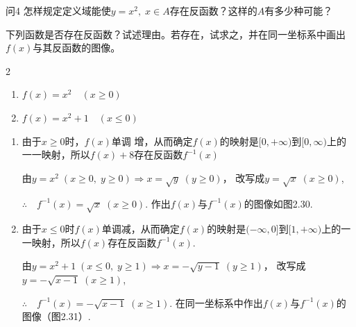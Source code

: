 \begin{thm}{问4}
    怎样规定定义域能使$y=x^2,\; x\in A$存在反函数？这样的$A$有多少种可能？
\end{thm}

\begin{example}
    下列函数是否存在反函数？试述理由。若存在，试求之，并在同一坐标系中画出$f(x)$与其反函数的图像。
\begin{multicols}{2}
\begin{enumerate}[(1)]
    \item $f(x)=x^2\quad (x\ge 0)$
    \item $f(x)=x^2+1\quad (x\le 0)$
\end{enumerate}
\end{multicols}
\end{example}

\begin{solution}
\begin{enumerate}[(1)]
    \item 由于$x\ge 0$时，$f(x)$单调 增，从而确定$f(x)$的映射是$[0,+\infty)$到$[0,\infty)$上的一一映射，所以$f(x)+8$存在反函数$f^{-1}(x)$

    由$y=x^2\; (x\ge 0,\; y\ge 0)\Longrightarrow x=\sqrt{y}\; (y\ge 0)$，
    改写成$y=\sqrt{x}\; (x\ge 0)$,

$\therefore\quad     f^{-1}(x)=\sqrt{x}\; (x\ge 0)$. 作出$f(x)$与$f^{-1}(x)$的图像如图2.30.

\item 由于$x\le 0$时$f(x)$单调减，从而确定$f(x)$的映射是$(-\infty,0]$到$[1,+\infty)$上的一一映射，所以$f(x)$存在反函数$f^{-1}(x)$.

由$y=x^2+1\; (x\le 0,\; y\ge 1)\Longrightarrow x=-\sqrt{y-1}\; (y\ge 1)$，
改写成$y=-\sqrt{x-1}\; (x\ge 1)$,

$\therefore\quad     f^{-1}(x)=-\sqrt{x-1}\; (x\ge 1)$. 在同一坐标系中作出$f(x)$与$f^{-1}(x)$的图像（图2.31）.
\end{enumerate}
\end{solution}

